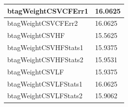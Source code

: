 \begin{table}[ht]
\begin{tabular}{|l|l|}
btagWeightCSVCFErr1            & 16.0625                                                         \\ \hline
btagWeightCSVCFErr2            & 16.0625                                                         \\ \hline
btagWeightCSVHF                & 15.5625                                                         \\ \hline
btagWeightCSVHFStats1          & 15.9375                                                         \\ \hline
btagWeightCSVHFStats2          & 15.9531                                                         \\ \hline
btagWeightCSVLF                & 15.9375                                                         \\ \hline
btagWeightCSVLFStats1          & 16.0625                                                         \\ \hline
btagWeightCSVLFStats2          & 15.9062                                                         \\ \hline
\end{tabular}
\end{table}


